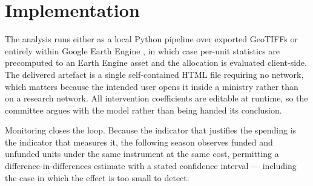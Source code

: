 \documentclass[11pt,a4paper]{article}
\begin{document}
\section{Implementation}

The analysis runs either as a local Python pipeline over exported GeoTIFFs or
entirely within Google Earth Engine \citep{gorelick2017}, in which case
per-unit statistics are precomputed to an Earth Engine asset and the allocation
is evaluated client-side. The delivered artefact is a single self-contained HTML
file requiring no network, which matters because the intended user opens it
inside a ministry rather than on a research network. All intervention
coefficients are editable at runtime, so the committee argues with the model
rather than being handed its conclusion.

Monitoring closes the loop. Because the indicator that justifies the spending is
the indicator that measures it, the following season observes funded and unfunded
units under the same instrument at the same cost, permitting a
difference-in-differences estimate with a stated confidence interval --- including
the case in which the effect is too small to detect.



\end{document}
